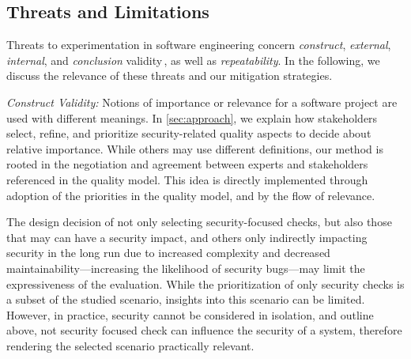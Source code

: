 \subsection{Threats and Limitations}
\label{sec:threats}

Threats to experimentation in software engineering %
concern
\emph{construct}, \emph{external}, \emph{internal}, and \emph{conclusion} validity\,\cite{Jedlitschka2008RES}, as well as \emph{repeatability}.
In the following, we discuss the relevance of these threats and our mitigation strategies.

\textit{Construct Validity:}
%
Notions of importance or relevance for a software project are used with different meanings. %
In \autoref{sec:approach}, we explain %
how stakeholders select, refine, and prioritize security-related quality aspects to decide about relative importance.
While others may use different definitions, our method is rooted in the negotiation and agreement between experts and stakeholders %
referenced in the quality model.
This idea is %
directly implemented through adoption of the priorities in the quality model, and by the flow of relevance.

	The design decision of not only selecting security-focused checks, but also those that may can have a security impact, and others only indirectly impacting security in the long run due to increased complexity and decreased maintainability---increasing the likelihood of security bugs---may limit the expressiveness of the evaluation.
	While the prioritization of only security checks is a subset of the studied scenario, insights into this scenario can be limited.
	However, in practice, security cannot be considered in isolation, and outline above, not security focused check can influence the security of a system, therefore rendering the selected scenario practically relevant.


